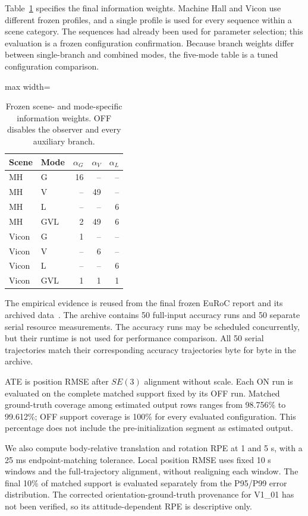 \documentclass[a4paper,runningheads,twocolumn]{llncs}
\begin{document}
Table~\ref{tab:weights} specifies the final information weights. Machine Hall and Vicon use different frozen profiles, and a single profile is used for every sequence within a scene category. The sequences had already been used for parameter selection; this evaluation is a frozen configuration confirmation. Because branch weights differ between single-branch and combined modes, the five-mode table is a tuned configuration comparison.
\begin{table}[tb]
\caption{Frozen scene- and mode-specific information weights. OFF disables the observer and every auxiliary branch.}\label{tab:weights}
\centering\small
\begin{adjustbox}{max width=\columnwidth}
\begin{tabular}{llrrr}
\toprule
Scene & Mode & $\alpha_G$ & $\alpha_V$ & $\alpha_L$ \\
\midrule
MH & G & 16 & -- & -- \\
MH & V & -- & 49 & -- \\
MH & L & -- & -- & 6 \\
MH & GVL & 2 & 49 & 6 \\
Vicon & G & 1 & -- & -- \\
Vicon & V & -- & 6 & -- \\
Vicon & L & -- & -- & 6 \\
Vicon & GVL & 1 & 1 & 1 \\
\bottomrule
\end{tabular}
\end{adjustbox}
\end{table}

The empirical evidence is reused from the final frozen EuRoC report and its archived data~\cite{experiment2026}. The archive contains 50 full-input accuracy runs and 50 separate serial resource measurements. The accuracy runs may be scheduled concurrently, but their runtime is not used for performance comparison. All 50 serial trajectories match their corresponding accuracy trajectories byte for byte in the archive.

ATE is position RMSE after $SE(3)$ alignment without scale. Each ON run is evaluated on the complete matched support fixed by its OFF run. Matched ground-truth coverage among estimated output rows ranges from 98.756\% to 99.612\%; OFF support coverage is 100\% for every evaluated configuration. This percentage does not include the pre-initialization segment as estimated output.

We also compute body-relative translation and rotation RPE at 1 and 5 s, with a 25 ms endpoint-matching tolerance. Local position RMSE uses fixed 10 s windows and the full-trajectory alignment, without realigning each window. The final 10\% of matched support is evaluated separately from the P95/P99 error distribution. The corrected orientation-ground-truth provenance for V1\_01 has not been verified, so its attitude-dependent RPE is descriptive only.
\end{document}
